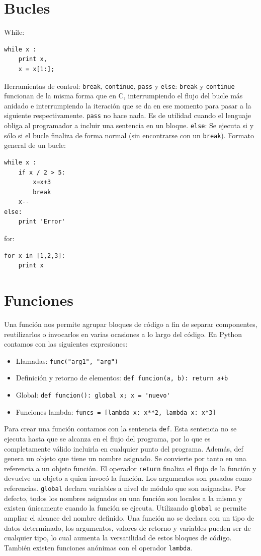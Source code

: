 \documentclass[12pt]{article} %
\begin{document}
\section{Bucles}
While:
\begin{lstlisting}[frame=single, showspaces=false]
while x :
	print x,
	x = x[1:];
\end{lstlisting}
Herramientas de control: \verb+break+, \verb+continue+, \verb+pass+ y \verb+else+:
\verb+break+ y \verb+continue+ funcionan de la misma forma que en C, interrumpiendo el flujo del bucle más anidado e interrumpiendo la iteración que se da en ese momento para pasar a la siguiente respectivamente.
\verb+pass+ no hace nada. Es de utilidad cuando el lenguaje obliga al programador a incluir una sentencia en un bloque.
\verb+else+: Se ejecuta si y sólo si el bucle finaliza de forma normal (sin encontrarse con un \verb+break+).
Formato general de un bucle:
\begin{lstlisting}[frame=single, showspaces=false]
while x :
	if x / 2 > 5:
		x=x+3
		break
	x--
else:
	print 'Error'
\end{lstlisting}
{\Large for:}
\begin{lstlisting}[frame=single, showspaces=false]
for x in [1,2,3]:
	print x
\end{lstlisting}
\newpage
\section{Funciones}
Una función nos permite agrupar bloques de código a fin de separar componentes, reutilizarlos o invocarlos en varias ocasiones a lo largo del código. En Python contamos con las siguientes expresiones:
\begin{itemize}
	\item Llamadas: \verb+func("arg1", "arg")+
	\item Definición y retorno de elementos: \verb|def funcion(a, b): return a+b|
	\item Global: \verb+def funcion(): global x; x = 'nuevo'+
	\item Funciones lambda: \verb+funcs = [lambda x: x**2, lambda x: x*3]+
\end{itemize}

Para crear una función contamos con la sentencia \verb+def+. Esta sentencia no se ejecuta hasta que se alcanza en el flujo del programa, por lo que es completamente válido incluirla en cualquier punto del programa. Además, def genera un objeto que tiene un nombre asignado. Se convierte por tanto en una referencia a un objeto función. El operador \verb+return+ finaliza el flujo de la función y devuelve un objeto a quien invocó la función. Los argumentos son pasados como referencias. \verb+global+ declara variables a nivel de módulo que son asignadas. Por defecto, todos los nombres asignados en una función son locales a la misma y existen únicamente cuando la función se ejecuta. Utilizando \verb+global+ se permite ampliar el alcance del nombre definido.
Una función no se declara con un tipo de datos determinado, los argumentos, valores de retorno y variables pueden ser de cualquier tipo, lo cual aumenta la versatilidad de estos bloques de código.
También existen funciones anónimas con el operador \verb+lambda+.
\end{document}
